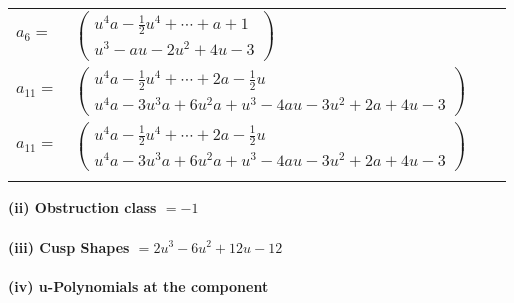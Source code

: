 \documentclass[1p]{elsarticle_modified}
\theoremstyle{definition}
\begin{document}
\begin{tabular}{m{7pt} m{180pt} m{7pt} m{180pt} }
\flushright $a_{6}=$&$\begin{pmatrix}u^4 a-\frac{1}{2} u^4+\cdots+a+1\\u^3- a u-2 u^2+4 u-3\end{pmatrix}$ \\
\flushright $a_{11}=$&$\begin{pmatrix}u^4 a-\frac{1}{2} u^4+\cdots+2 a-\frac{1}{2} u\\u^4 a-3 u^3 a+6 u^2 a+u^3-4 a u-3 u^2+2 a+4 u-3\end{pmatrix}$\\ \flushright $a_{11}=$&$\begin{pmatrix}u^4 a-\frac{1}{2} u^4+\cdots+2 a-\frac{1}{2} u\\u^4 a-3 u^3 a+6 u^2 a+u^3-4 a u-3 u^2+2 a+4 u-3\end{pmatrix}$\\&\end{tabular}
\flushleft \textbf{(ii) Obstruction class $= -1$}\\~\\
\flushleft \textbf{(iii) Cusp Shapes $= 2 u^3-6 u^2+12 u-12$}\\~\\
\newpage\renewcommand{\arraystretch}{1}
\flushleft \textbf{(iv) u-Polynomials at the component}\newline \\
\end{document}
